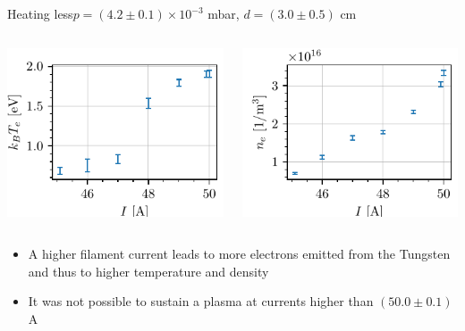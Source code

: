 \documentclass[10pt]{beamer}
\begin{document}
\begin{frame}{Heating less}{$p = (4.2 \pm 0.1) \times 10^{-3}$ mbar, $d = (3.0 \pm 0.5)$ cm}
    \begin{columns}
        \centering
        \includegraphics[scale=1]{../figures/temperatureeV_current.pdf}


        \centering
        \includegraphics[scale=1]{../figures/density_current.pdf}

    \end{columns}
    \vspace{0.5cm}
    \begin{itemize}
        \item A higher filament current leads to more electrons emitted from the Tungsten and thus to higher temperature and density
        \item It was not possible to sustain a plasma at currents higher than $(50.0 \pm 0.1)$ A
    \end{itemize}
\end{frame}

\end{document}
